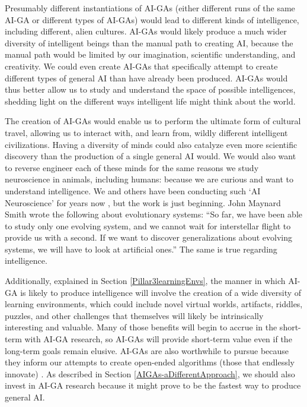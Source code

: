 \documentclass{article}
\begin{document}
Presumably different instantiations of AI-GAs (either different runs of the same AI-GA or different types of AI-GAs) would lead to different kinds of intelligence, including different, alien cultures. AI-GAs would likely produce a much wider diversity of intelligent beings than the manual path to creating AI, because the manual path would be limited by our imagination, scientific understanding, and creativity. We could even create AI-GAs that specifically attempt to create different types of general AI than have already been produced. AI-GAs would thus better allow us to study and understand the space of possible intelligences, shedding light on the different ways intelligent life might think about the world.

The creation of AI-GAs would enable us to perform the ultimate form of cultural travel, allowing us to interact with, and learn from, wildly different intelligent civilizations. Having a diversity of minds could also catalyze even more scientific discovery than the production of a single general AI would. We would also want to reverse engineer each of these minds for the same reasons we study neuroscience in animals, including humans: because we are curious and want to understand intelligence. We and others have been conducting such `AI Neuroscience' for years now \cite{nguyen2015deep,nguyen2016multifaceted,nguyen2017plug,nguyen2016synthesizing,yosinski2015understanding,li2016convergent, yosinski2014transferable,szegedy2013intriguing,mahendran2014understanding,zeiler2014visualizing,li2015visualizing,greydanus2017visualizing}, but the work is just beginning. 
John Maynard Smith wrote the following about evolutionary systems: ``So far, we have been able to study only one evolving system, and we cannot wait for interstellar flight to provide us with a second. If we want to discover generalizations about evolving systems, we will have to look at artificial ones.'' \cite{Maynard-Smith:1992aa} The same is true regarding intelligence. 

Additionally, explained in Section \ref{Pillar3learningEnvs}, the manner in which AI-GA is likely to produce intelligence will involve the creation of a wide diversity of learning environments, which could include novel virtual worlds, artifacts, riddles, puzzles, and other challenges that themselves will likely be intrinsically interesting and valuable. Many of those benefits will begin to accrue in the short-term with AI-GA research, so AI-GAs will provide short-term value even if the long-term goals remain elusive. 
AI-GAs are also worthwhile to pursue because they inform our attempts to create open-ended algorithms (those that endlessly innovate) \cite{stanley:open}. As described in Section \ref{AIGAs-aDifferentApproach}, we should also invest in AI-GA research because it might prove to be the fastest way to produce general AI. 
\end{document}
